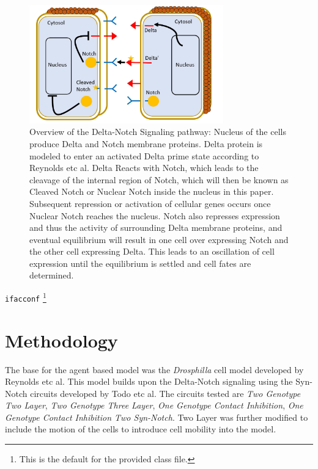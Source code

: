 \begin{figure}
\begin{center}
\includegraphics[width=8.4cm]{Overview_of_Delta_Notch}    %
\caption{Overview of the Delta-Notch Signaling pathway: Nucleus of the cells produce Delta and Notch membrane proteins. Delta protein is modeled to enter an activated Delta prime state according to Reynolds etc al. Delta Reacts with Notch, which leads to the cleavage of the internal region of Notch, which will then be known as Cleaved Notch or Nuclear Notch inside the nucleus in this paper. Subsequent repression or activation of cellular genes occurs once Nuclear Notch reaches the nucleus. Notch also represses expression and thus the activity of surrounding Delta membrane proteins, and eventual equilibrium will result in one cell over expressing Notch and the other cell expressing Delta. This leads to an oscillation of cell expression until the equilibrium is settled and cell fates are determined. } 
\label{fig:bifurcation}
\end{center}
\end{figure}


 \texttt{ifacconf}
\footnote{
This is the default for the provided class file.}




\section{Methodology}

The base for the agent based model was the \emph{Drosphilla} cell model developed by Reynolds etc al. This model builds upon the Delta-Notch signaling using the Syn-Notch circuits developed by Todo etc al. The circuits tested are \emph{Two Genotype Two Layer}, \emph{Two Genotype Three Layer}, \emph{One Genotype Contact Inhibition}, \emph{One Genotype Contact Inhibition Two Syn-Notch}. Two Layer was further modified to include the motion of the cells to introduce cell mobility into the model.


